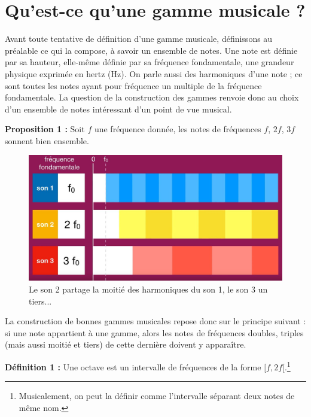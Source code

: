 \documentclass[moyen]{classeUPD}
\newenvironment{definition}{
	\begin{lrbox}{\tempbox}
		\begin{minipage}{\textwidth}
		}{
		\end{minipage}
	\end{lrbox}
	\begin{center}
		\fcolorbox[HTML]{222222}{EEEEEE}{
			\usebox{\tempbox}
		}
	\end{center}
}
\newcommand{\emf}[1]{\textbf{#1}}
\begin{document}
\chapter{Qu’est-ce qu’une gamme musicale ?}

Avant toute tentative de définition d’une gamme musicale, définissons au préalable ce qui la compose, à savoir un ensemble de notes. Une note est définie par sa hauteur, elle-même définie par sa fréquence fondamentale, une grandeur physique exprimée en hertz (Hz). On parle aussi des harmoniques d'une note ; ce sont toutes les notes ayant pour fréquence un multiple de la fréquence fondamentale. La question de la construction des gammes renvoie donc au choix d’un ensemble de notes intéressant d’un point de vue musical.
\begin{definition}
	\emf{Proposition 1 :} Soit $f$ une fréquence donnée, les notes de fréquences $f$, $2f$, $3f$ sonnent bien ensemble.\\
\end{definition}

\begin{figure}[h!]
	\begin{center}
		\includegraphics[width=0.6\textheight]{Notes2}
		\caption{Le son 2 partage la moitié des harmoniques du son 1, le son 3 un tiers...}
		\label{figure 1}
	\end{center}
\end{figure}

La construction de bonnes gammes musicales repose donc sur le principe suivant : si une note appartient à une gamme, alors les notes de fréquences doubles, triples (mais aussi moitié et tiers) de cette dernière doivent y apparaître.

\begin{definition}
	\emf{Définition 1 :} Une octave est un intervalle de fréquences de la forme $[f,2f[$.\footnote{Musicalement, on peut la définir comme l’intervalle séparant deux notes de même nom.}\\
\end{definition}
\end{document}
